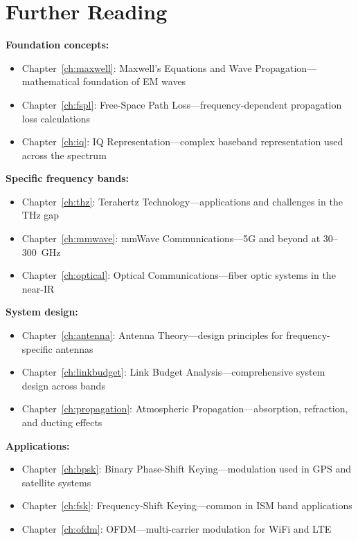 \section{Further Reading}

\textbf{Foundation concepts:}
\begin{itemize}
\item Chapter~\ref{ch:maxwell}: Maxwell's Equations and Wave Propagation---mathematical foundation of EM waves
\item Chapter~\ref{ch:fspl}: Free-Space Path Loss---frequency-dependent propagation loss calculations
\item Chapter~\ref{ch:iq}: IQ Representation---complex baseband representation used across the spectrum
\end{itemize}

\textbf{Specific frequency bands:}
\begin{itemize}
\item Chapter~\ref{ch:thz}: Terahertz Technology---applications and challenges in the THz gap
\item Chapter~\ref{ch:mmwave}: mmWave Communications---5G and beyond at 30--300~GHz
\item Chapter~\ref{ch:optical}: Optical Communications---fiber optic systems in the near-IR
\end{itemize}

\textbf{System design:}
\begin{itemize}
\item Chapter~\ref{ch:antenna}: Antenna Theory---design principles for frequency-specific antennas
\item Chapter~\ref{ch:linkbudget}: Link Budget Analysis---comprehensive system design across bands
\item Chapter~\ref{ch:propagation}: Atmospheric Propagation---absorption, refraction, and ducting effects
\end{itemize}

\textbf{Applications:}
\begin{itemize}
\item Chapter~\ref{ch:bpsk}: Binary Phase-Shift Keying---modulation used in GPS and satellite systems
\item Chapter~\ref{ch:fsk}: Frequency-Shift Keying---common in ISM band applications
\item Chapter~\ref{ch:ofdm}: OFDM---multi-carrier modulation for WiFi and LTE
\end{itemize}
